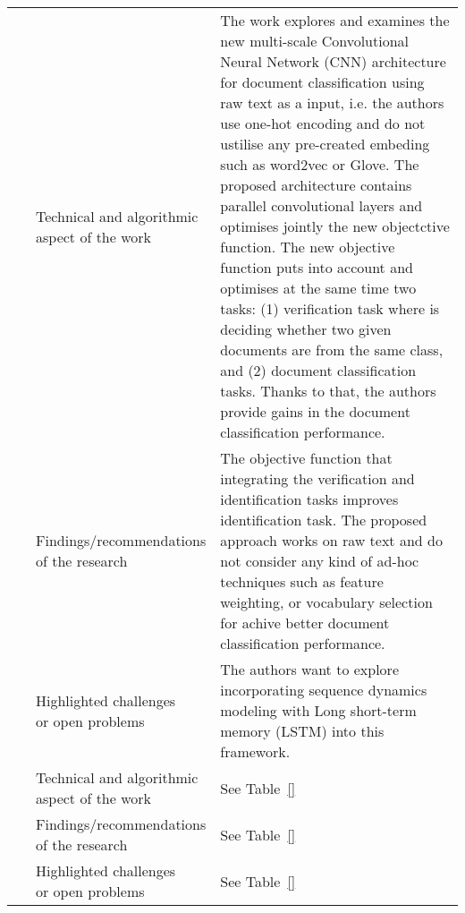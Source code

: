 \begin{landscape}
\begin{longtable}{lp{}p{}}
	\multirow{3}[0]{*}{~\citep{Pappagari2018}} & 
    \specialcell{Technical and algorithmic \\ aspect of the work} &
	The work explores and examines the new multi-scale Convolutional Neural Network (CNN) architecture for document classification using raw text as a input, i.e. the authors use one-hot encoding and do not ustilise any pre-created embeding such as word2vec or Glove. The proposed architecture contains parallel convolutional layers and optimises jointly the new objectctive function. The new objective function puts into account and optimises at the same time two tasks: (1) verification task where is deciding whether two given documents are from the same class, and (2) document classification tasks. Thanks to that, the authors provide gains in the document classification performance.     
    \\ & 
    \specialcell{Findings/recommendations \\ of the research} & 
	The objective function that integrating the verification and identification tasks improves identification task. The proposed approach works on raw text and do not consider any kind of ad-hoc techniques such as feature weighting, or vocabulary selection for achive better document classification performance.
    \\ & 
    \specialcell{Highlighted challenges \\ or open problems} & 
    The authors want to explore incorporating sequence dynamics modeling with Long short-term memory (LSTM) into this framework.
	\\
	
	\multirow{3}[0]{*}{~\citep{AlSalemi2018}} & 
    \specialcell{Technical and algorithmic \\ aspect of the work} &
	See Table~\ref{}
    \\ & 
    \specialcell{Findings/recommendations \\ of the research} & 
	See Table~\ref{}  
    \\ & 
    \specialcell{Highlighted challenges \\ or open problems} & 
	See Table~\ref{}
	\\
	

\end{longtable}
\end{landscape}
